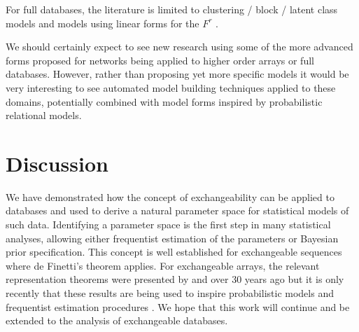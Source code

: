 For full databases, the literature is limited to clustering / block / latent class models \citep{Kemp2006-jt, Xu2006-uy} and models using linear forms for the $F^r$ \citep[e.g.][]{Lippert2008-gg, Singh2008-cb, Singh2008-qw, Jimeng2009-rw, Acar2011-vg, Gao2011-ac, Nickel2011-pi, Acar2012-no, Ermis2012-gk, Shangguan2012-ga, Singh2012-jj, Acar2013-na, Andersen2013-rg, Yin2013-we}.

We should certainly expect to see new research using some of the more advanced forms proposed for networks being applied to higher order arrays or full databases.
However, rather than proposing yet more specific models it would be very interesting to see automated model building techniques applied to these domains, potentially combined with model forms inspired by probabilistic relational models.

\section{Discussion}

We have demonstrated how the concept of exchangeability can be applied to databases and used to derive a natural parameter space for statistical models of such data.
Identifying a parameter space is the first step in many statistical analyses, allowing either frequentist estimation of the parameters or Bayesian prior specification.
This concept is well established for exchangeable sequences where de Finetti's theorem applies.
For exchangeable arrays, the relevant representation theorems were presented by \citet{Aldous1981-lg} and \citet{Hoover1979-br} over 30 years ago but it is only recently that these results are being used to inspire probabilistic models \cite{Hoff2007-ja, Roy2009-ge, Lloyd2012-sb} and frequentist estimation procedures \cite{Kallenberg1999-pj, Choi2013-th, Wolfe2013-vs}.
We hope that this work will continue and be extended to the analysis of exchangeable databases.



\outbpdocument{


}
